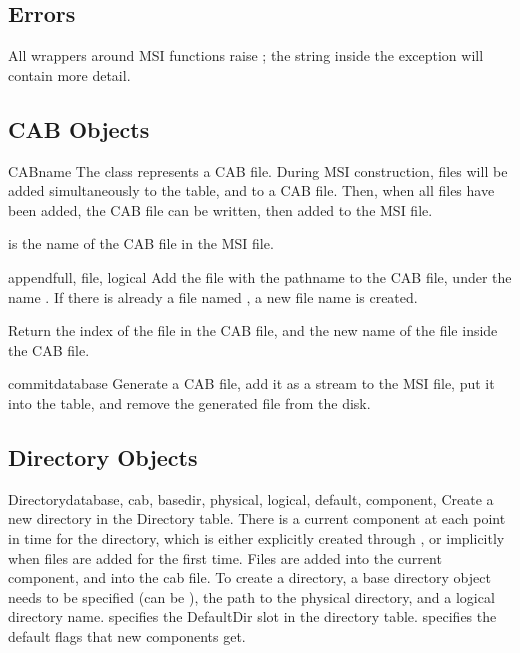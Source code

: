 \subsection{Errors\label{msi-errors}}

All wrappers around MSI functions raise ;
the string inside the exception will contain more detail.

\subsection{CAB Objects\label{cab}}

\begin{classdesc}{CAB}{name}
  The class  represents a CAB file. During MSI construction,
  files will be added simultaneously to the  table, and
  to a CAB file. Then, when all files have been added, the CAB file
  can be written, then added to the MSI file.

   is the name of the CAB file in the MSI file.
\end{classdesc}

\begin{methoddesc}[CAB]{append}{full, file, logical}
  Add the file with the pathname  to the CAB file,
  under the name . If there is already a file
  named , a new file name is created.

  Return the index of the file in the CAB file, and the
  new name of the file inside the CAB file.
\end{methoddesc}

\begin{methoddesc}[CAB]{commit}{database}
  Generate a CAB file, add it as a stream to the MSI file,
  put it into the  table, and remove the generated
  file from the disk.
\end{methoddesc}

\subsection{Directory Objects\label{msi-directory}}

\begin{classdesc}{Directory}{database, cab, basedir, physical, 
                  logical, default, component, }
  Create a new directory in the Directory table. There is a current
  component at each point in time for the directory, which is either
  explicitly created through , or implicitly when files
  are added for the first time. Files are added into the current
  component, and into the cab file.  To create a directory, a base
  directory object needs to be specified (can be ), the path to
  the physical directory, and a logical directory name.  
  specifies the DefaultDir slot in the directory table. 
  specifies the default flags that new components get.
\end{classdesc}

